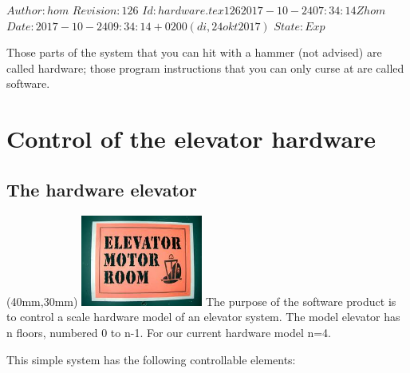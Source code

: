 \renewcommand\TheFile{hardware.tex}
\SVN $Author: hom $
\SVN $Revision: 126 $
\SVN $Id: hardware.tex 126 2017-10-24 07:34:14Z hom $
\SVN $Date: 2017-10-24 09:34:14 +0200 (di, 24 okt 2017) $
\SVN $State: Exp $
\begin{savequote}[8cm]
  \sffamily
  Those parts of the system that you can hit with a hammer (not
  advised) are called hardware; those program instructions that you
  can only curse at are called software.
\end{savequote}
\chapter{Control of the elevator hardware}

\section{The hardware elevator}
\parpic(40mm,30mm){
  \includegraphics[width=40mm]{figures/elevatormotorroom.jpeg}}
The purpose of the software product is to control a scale
hardware model of an elevator system. The model elevator has n floors,
numbered 0 to n-1. For our current hardware model n=4.

This simple system has the following controllable elements:

